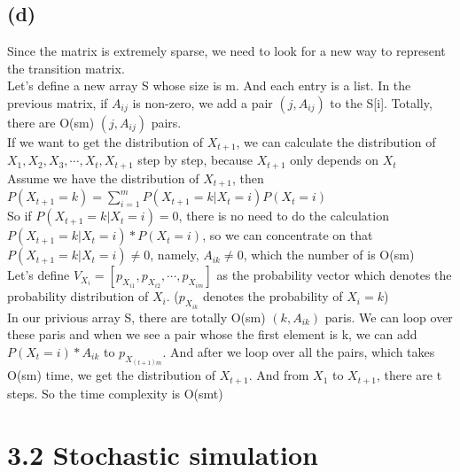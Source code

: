 \documentclass [11pt, a4paper, oneside] {article}
\begin{document}
\subsection *{(d)}
Since the matrix is extremely sparse, we need to look for a new way to represent the transition matrix. \\
Let's define a new array S whose size is m. And each entry is a list. In the previous matrix, if $A_{ij}$ is non-zero, we add a pair $(j, A_{ij})$ to the S[i]. Totally, there are O(sm)  $(j, A_{ij})$ pairs.\\
If we want to get the distribution of $X_{t+1}$, we can calculate the distribution of $X_1, X_2, X_3, \cdots, X_{t}, X_{t+1}$ step by step, because $X_{t+1}$ only depends on $X_{t}$\\
Assume we have the distribution of $X_{t+1}$, then\\
$P(X_{t+1}=k) = \sum\limits_{i=1}^{m}P(X_{t+1}=k|X_{t}=i)P(X_{t}=i)$\\
So if $P(X_{t+1}=k|X_{t}=i)=0$, there is no need to do the calculation $P(X_{t+1}=k|X_{t}=i)*P(X_{t}=i)$, so we can concentrate on that $P(X_{t+1}=k|X_{t}=i)\neq0$, namely, $A_{ik}\neq0$, which the number of is O(sm)\\
Let's define $V_{X_i} = [p_{X_{i1}}, p_{X_{i2}}, \cdots, p_{X_{im}}]$ as the probability vector which denotes the probability distribution of $X_i$. ($p_{X_{ik}}$ denotes the probability of $X_{i} = k$)\\
In our privious array S, there are totally O(sm) $(k, A_{ik})$ paris. We can loop over these paris and when we see a pair whose the first element is k, we can add $P(X_{t}=i)*A_{ik}$ to $p_{X_{(t+1)m}}$. And after we loop over all the pairs, which takes O(sm) time, we get the distribution of $X_{t+1}$. And from $X_{1}$ to $X_{t+1}$, there are t steps. So the time complexity is O(smt)\\
\section *{3.2 Stochastic simulation}
\end{document}
